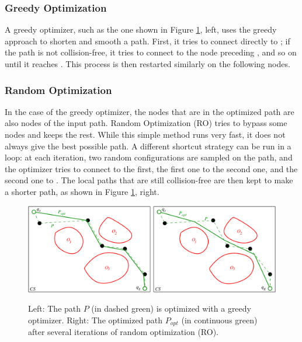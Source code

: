 \subsubsection{Greedy Optimization}

A greedy optimizer, such as the one shown in Figure
\ref{fig:chap1-optimizers}, left, uses the greedy approach to shorten
and smooth a path. First, it tries to connect directly  to
; if the path is not collision-free, it tries to connect
 to the node preceding , and so on until it
reaches . This process is then restarted similarly on the
following nodes.

\subsubsection{Random Optimization}
\label{subsubsec:chap3-random-optimization}

In the case of the greedy optimizer, the nodes that are in the
optimized path are also nodes of the input path. Random Optimization
(RO) tries to bypass some nodes and keeps the rest. While this simple
method runs very fast, it does not always give the best possible
path. A different shortcut strategy can be run in a loop: at each
iteration, two random configurations are sampled on the path, and the
optimizer tries to connect  to the first, the first one to
the second one, and the second one to . The local paths that
are still collision-free are then kept to make a shorter path, as
shown in Figure \ref{fig:chap1-optimizers}, right.

\begin{figure}
  \centering
      {\includegraphics[width = \linewidth]
        {src/chap1-path-optimization/optimizers.pdf}}
      \caption[Shortcut optimization techniques.]{Left: The path $P$
        (in dashed green) is optimized with a greedy optimizer. Right:
        The optimized path $P_{opt}$ (in continuous green) after
        several iterations of random optimization (RO).}
      \label{fig:chap1-optimizers}
\end{figure}


